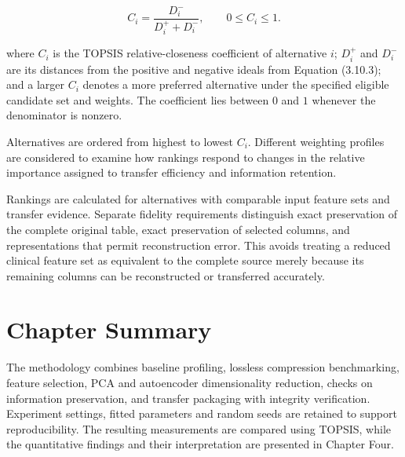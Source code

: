 \[
C_i=\frac{D_i^-}{D_i^++D_i^-},
\qquad 0\le C_i\le1.\tag{3.10.4}
\]

\noindent where \(C_i\) is the TOPSIS relative-closeness coefficient of
alternative \(i\); \(D_i^+\) and \(D_i^-\) are its distances from the
positive and negative ideals from Equation (3.10.3); and a larger
\(C_i\) denotes a more preferred alternative under the specified
eligible candidate set and weights. The coefficient lies between \(0\)
and \(1\) whenever the denominator is nonzero.

\noindent Alternatives are ordered from highest to lowest \(C_i\). Different weighting profiles are considered to examine how rankings respond to changes in the relative importance assigned to transfer efficiency and information retention.

\noindent Rankings are calculated for alternatives with comparable input feature
sets and transfer evidence. Separate fidelity requirements distinguish
exact preservation of the complete original table, exact preservation of
selected columns, and representations that permit reconstruction error.
This avoids treating a reduced clinical feature set as equivalent to the
complete source merely because its remaining columns can be
reconstructed or transferred accurately.

\section{Chapter Summary}\label{sec:methods-summary}

The methodology combines baseline profiling, lossless compression
benchmarking, feature selection, PCA and autoencoder dimensionality
reduction, checks on information preservation, and transfer packaging
with integrity verification. Experiment settings, fitted parameters and
random seeds are retained to support reproducibility. The resulting
measurements are compared using TOPSIS, while the quantitative findings
and their interpretation are presented in Chapter Four.
